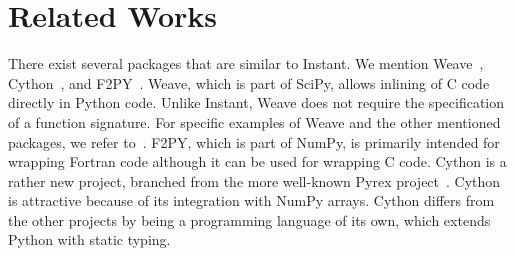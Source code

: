 \section{Related Works}
There exist several packages that are similar to Instant.
We mention Weave~\cite{www:weave},
Cython~\cite{EwingBradshawBehnelEtAl2009}, and F2PY~\cite{Peterson}.
Weave, which is part of SciPy,  allows  inlining of C code directly in Python code. 
Unlike Instant, Weave does not require the specification of a function
signature. For specific examples of Weave and the
other mentioned packages, we refer to~\cite{IIIBehieTrangenstein1988,www:weave}. 
F2PY, which is part of NumPy, is primarily intended
for wrapping Fortran code although it can be used for wrapping C code.
Cython is a rather new project, branched from the more well-known Pyrex
project~\cite{Ewing2009}. Cython is attractive because of  its integration
with NumPy arrays. Cython differs from the other projects by being a programming
language of its own, which extends Python with static typing.


